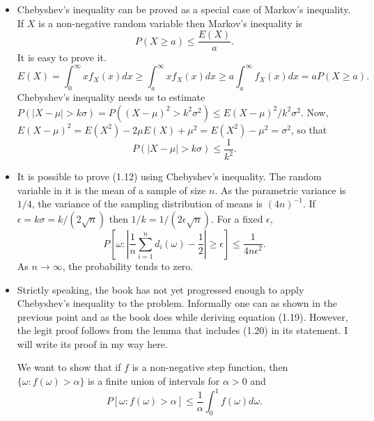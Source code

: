 \begin{itemize}
\item Chebyshev's inequality can be proved as a special case of Markov's
inequality. If $X$ is a non-negative random variable then Markov's inequality
is
\begin{equation}\label{c1s1e4}
P(X \ge a) \le \frac{E(X)}{a}.
\end{equation}
It is easy to prove it.
\[
E(X) = \int_0^\infty xf_X(x)dx \ge \int_a^\infty xf_X(x)dx \ge a\int_a^\infty
f_X(x)dx = aP(X \ge a).
\]
Chebyshev's inequality needs us to estimate $P(|X - \mu| > k\sigma) =
P((X - \mu)^2 > k^2\sigma^2) \le E(X - \mu)^2/k^2\sigma^2$. Now, $E(X - \mu)^2
= E(X^2) - 2\mu E(X) + \mu^2 = E(X^2) - \mu^2 = \sigma^2$, so that
\begin{equation}\label{c1s1e5}
P(|X - \mu| > k\sigma) \le \frac{1}{k^2}.
\end{equation}

\item It is possible to prove (1.12) using Chebyshev's inequality. The random
variable in it is the mean of a sample of size $n$. As the parametric variance
is $1/4$, the variance of the sampling distribution of means is $(4n)^{-1}$.
If $\epsilon = k\sigma = k/(2\sqrt{n})$ then $1/k = 1/(2\epsilon\sqrt{n})$. 
For a fixed $\epsilon$,
\[
P\left[\omega: \left|\frac{1}{n}\sum_{i=1}^n d_i(\omega) - \frac{1}{2}\right|
\ge \epsilon\right] \le \frac{1}{4n\epsilon^2}.
\]
As $n \rightarrow \infty$, the probability tends to zero.

\item Strictly speaking, the book has not yet progressed enough to apply
Chebyshev's inequality to the problem. Informally one can as shown in the
previous point and as the book does while deriving equation (1.19). However,
the legit proof follows from the lemma that includes (1.20) in its statement.
I will write its proof in my way here.

We want to show that if $f$ is a non-negative step function, then $\{\omega:
f(\omega) > \alpha\}$ is a finite union of intervals for $\alpha > 0$ and
\[
P\left[\omega: f(\omega) > \alpha\right] \le \frac{1}{\alpha}\int_0^1 f(\omega)
d\omega.
\]


\end{itemize}

